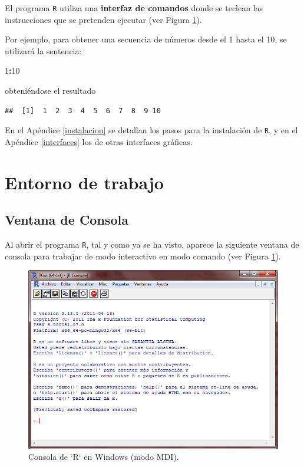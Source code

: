 \documentclass[]{book}
\newenvironment{Shaded}{\begin{snugshade}}{\end{snugshade}}
\newcommand{\DecValTok}[1]{\textcolor[rgb]{0.00,0.00,0.81}{#1}}
\newcommand{\OperatorTok}[1]{\textcolor[rgb]{0.81,0.36,0.00}{\textbf{#1}}}
\begin{document}
El programa \texttt{R}
utiliza una \textbf{interfaz de comandos} donde se teclean las instrucciones
que se pretenden ejecutar (ver Figura \ref{fig:consola}).

Por ejemplo, para obtener una secuencia de números desde el 1 hasta el
10, se utilizará la sentencia:

\begin{Shaded}
\begin{Highlighting}[]
\DecValTok{1}\OperatorTok{:}\DecValTok{10}
\end{Highlighting}
\end{Shaded}

obteniéndose el resultado

\begin{verbatim}
##  [1]  1  2  3  4  5  6  7  8  9 10
\end{verbatim}

En el Apéndice \ref{instalacion} se detallan los pasos para la instalación de \texttt{R},
y en el Apéndice \ref{interfaces} los de otras interfaces gráficas.

\hypertarget{entorno-de-trabajo}{%
\section{Entorno de trabajo}\label{entorno-de-trabajo}}

\hypertarget{ventana-de-consola}{%
\subsection{Ventana de Consola}\label{ventana-de-consola}}

Al abrir el programa \texttt{R}, tal y como ya
se ha visto, aparece la siguiente ventana de consola para trabajar de
modo interactivo en modo comando (ver Figura \ref{fig:consola}).

\begin{figure}[!htb]

{\centering \includegraphics[width=0.7\linewidth]{figuras/consola} 

}

\caption{Consola de `R` en Windows (modo MDI).}\label{fig:consola}
\end{figure}
\end{document}
